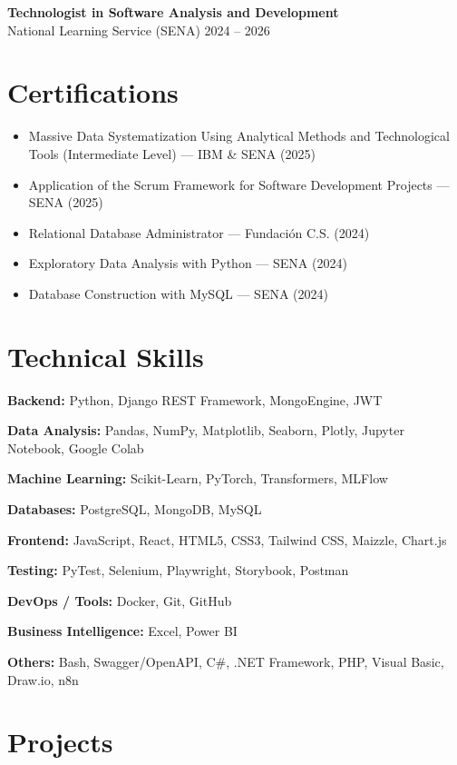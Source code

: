\documentclass[11pt,a4paper]{article}
\begin{document}
\textbf{Technologist in Software Analysis and Development} \\
National Learning Service (SENA) \hfill 2024 -- 2026

\section*{Certifications}

\begin{itemize}
    \item Massive Data Systematization Using Analytical Methods and Technological Tools (Intermediate Level) — IBM \& SENA (2025)
    \item Application of the Scrum Framework for Software Development Projects — SENA (2025)
    \item Relational Database Administrator — Fundación C.S. (2024)
    \item Exploratory Data Analysis with Python — SENA (2024)
    \item Database Construction with MySQL — SENA (2024)
\end{itemize}

\section*{Technical Skills}

\textbf{Backend:}
Python, Django REST Framework, MongoEngine, JWT

\textbf{Data Analysis:}
Pandas, NumPy, Matplotlib, Seaborn, Plotly, Jupyter Notebook, Google Colab

\textbf{Machine Learning:}
Scikit-Learn, PyTorch, Transformers, MLFlow

\textbf{Databases:}
PostgreSQL, MongoDB, MySQL

\textbf{Frontend:}
JavaScript, React, HTML5, CSS3, Tailwind CSS, Maizzle, Chart.js

\textbf{Testing:}
PyTest, Selenium, Playwright, Storybook, Postman

\textbf{DevOps / Tools:}
Docker, Git, GitHub

\textbf{Business Intelligence:}
Excel, Power BI

\textbf{Others:}
Bash, Swagger/OpenAPI, C\#, .NET Framework, PHP, Visual Basic, Draw.io, n8n

\section*{Projects}
\end{document}
